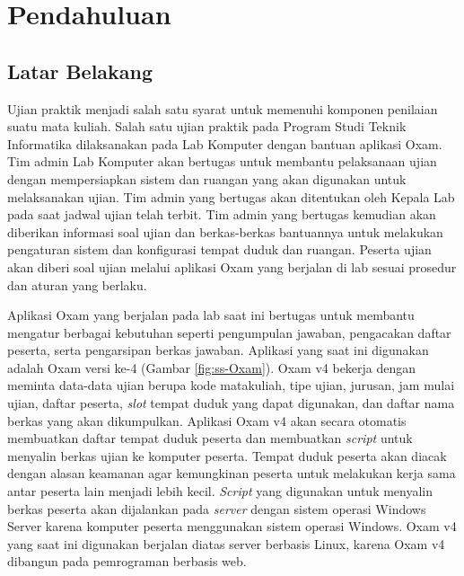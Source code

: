 \chapter{Pendahuluan}
\label{chap:intro}
   
\section{Latar Belakang}
\label{sec:label}
Ujian praktik menjadi salah satu syarat untuk memenuhi komponen penilaian
suatu mata kuliah.
Salah satu ujian praktik pada Program Studi Teknik Informatika 
dilaksanakan pada Lab Komputer dengan bantuan aplikasi Oxam.
Tim admin Lab Komputer akan bertugas untuk membantu
pelaksanaan ujian dengan mempersiapkan sistem dan ruangan yang akan digunakan
untuk melaksanakan ujian. Tim admin yang bertugas akan ditentukan oleh Kepala Lab pada 
saat jadwal ujian telah terbit. Tim admin yang bertugas kemudian akan diberikan informasi soal ujian
dan berkas-berkas bantuannya untuk melakukan pengaturan sistem dan konfigurasi tempat duduk dan ruangan.
Peserta ujian akan diberi soal ujian melalui aplikasi
Oxam yang berjalan di lab sesuai prosedur dan aturan yang berlaku.

Aplikasi Oxam yang berjalan pada lab saat ini bertugas untuk
membantu mengatur berbagai kebutuhan seperti pengumpulan jawaban, pengacakan
daftar peserta, serta pengarsipan berkas jawaban. Aplikasi yang saat ini
digunakan adalah Oxam versi ke-4 (Gambar \ref{fig:ss-Oxam}). Oxam v4 bekerja dengan meminta
data-data ujian berupa kode matakuliah, tipe ujian, jurusan, jam mulai ujian, daftar
peserta, \textit{slot} tempat duduk yang dapat digunakan, dan daftar nama berkas
yang akan dikumpulkan. Aplikasi Oxam v4 akan secara otomatis membuatkan daftar
tempat duduk peserta dan membuatkan \textit{script} untuk
menyalin berkas ujian ke komputer peserta. Tempat duduk peserta akan diacak dengan
alasan keamanan agar kemungkinan peserta untuk melakukan kerja sama antar peserta lain
menjadi lebih kecil. \textit{Script} yang digunakan untuk menyalin berkas peserta akan
dijalankan pada \textit{server} dengan sistem operasi Windows Server karena komputer peserta
menggunakan sistem operasi Windows. Oxam v4 yang saat ini digunakan berjalan diatas server
berbasis Linux, karena Oxam v4 dibangun pada pemrograman berbasis web.

